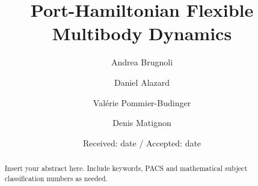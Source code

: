 \documentclass{svjour3}                     %
\begin{document}
\title{Port-Hamiltonian Flexible Multibody Dynamics%
}
\subtitle{}


\author{Andrea Brugnoli  \and
        Daniel Alazard \and 
        Valérie Pommier-Budinger \and
        Denis Matignon
}



\date{Received: date / Accepted: date}


\maketitle

\begin{abstract}
Insert your abstract here. Include keywords, PACS and mathematical
subject classification numbers as needed.
\end{abstract}
\end{document}
